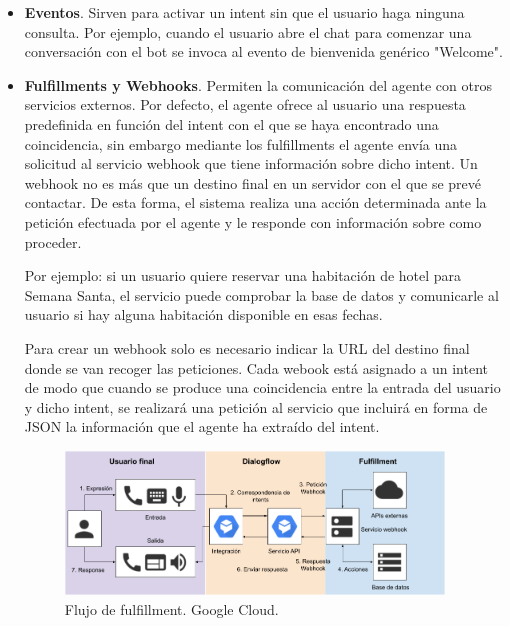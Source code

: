 \begin{itemize}
     \item \textbf{Eventos}. Sirven para activar un intent sin que el usuario haga ninguna consulta. Por ejemplo, cuando el usuario abre el chat para comenzar una conversación con el bot se invoca al evento de bienvenida genérico "Welcome".
     
     \item \textbf{Fulfillments y Webhooks}. Permiten la comunicación del agente con otros servicios externos. Por defecto, el agente ofrece al usuario una respuesta predefinida en función del intent con el que se haya encontrado una coincidencia, sin embargo mediante los fulfillments el agente envía una solicitud al servicio webhook que tiene información sobre dicho intent. Un webhook no es más que un destino final en un servidor con el que se prevé contactar. De esta forma, el sistema realiza una acción determinada ante la petición efectuada por el agente y le responde con información sobre como proceder.
     
     Por ejemplo: si un usuario quiere reservar una habitación de hotel para Semana Santa, el servicio puede comprobar la base de datos y comunicarle al usuario si hay alguna habitación disponible en esas fechas.
     
     Para crear un webhook solo es necesario indicar la URL del destino final donde se van recoger las peticiones. Cada webook está asignado a un intent de modo que cuando se produce una coincidencia entre la entrada del usuario y dicho intent, se realizará una petición al servicio que incluirá en forma de JSON la información que el agente ha extraído del intent. 
     
     \begin{figure}[ht]
         \begin{center}
            \includegraphics[width = 0.95\textwidth]{Figuras/Diagrama fulfillment.png}
         \end{center}
         \caption{\label{fig:DialogflowFulfillments}Flujo de fulfillment. Google Cloud.}
     \end{figure}
     
\end{itemize}